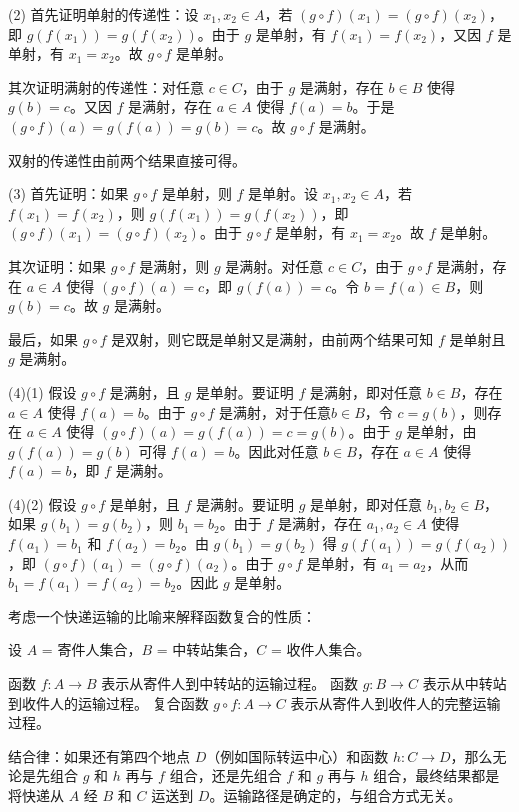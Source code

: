 (2) 首先证明单射的传递性：设 $x_1, x_2 \in A$，若 $(g \circ f)(x_1) = (g \circ f)(x_2)$，即 $g(f(x_1)) = g(f(x_2))$。由于 $g$ 是单射，有 $f(x_1) = f(x_2)$，又因 $f$ 是单射，有 $x_1 = x_2$。故 $g \circ f$ 是单射。

其次证明满射的传递性：对任意 $c \in C$，由于 $g$ 是满射，存在 $b \in B$ 使得 $g(b) = c$。又因 $f$ 是满射，存在 $a \in A$ 使得 $f(a) = b$。于是 $(g \circ f)(a) = g(f(a)) = g(b) = c$。故 $g \circ f$ 是满射。

双射的传递性由前两个结果直接可得。

(3) 首先证明：如果 $g \circ f$ 是单射，则 $f$ 是单射。设 $x_1, x_2 \in A$，若 $f(x_1) = f(x_2)$，则 $g(f(x_1)) = g(f(x_2))$，即 $(g \circ f)(x_1) = (g \circ f)(x_2)$。由于 $g \circ f$ 是单射，有 $x_1 = x_2$。故 $f$ 是单射。

其次证明：如果 $g \circ f$ 是满射，则 $g$ 是满射。对任意 $c \in C$，由于 $g \circ f$ 是满射，存在 $a \in A$ 使得 $(g \circ f)(a) = c$，即 $g(f(a)) = c$。令 $b = f(a) \in B$，则 $g(b) = c$。故 $g$ 是满射。

最后，如果 $g \circ f$ 是双射，则它既是单射又是满射，由前两个结果可知 $f$ 是单射且 $g$ 是满射。

(4)(1) 假设 $g \circ f$ 是满射，且 $g$ 是单射。要证明 $f$ 是满射，即对任意 $b \in B$，存在 $a \in A$ 使得 $f(a) = b$。由于 $g \circ f$ 是满射，对于任意$b \in B$，令 $c = g(b)$，则存在 $a \in A$ 使得 $(g \circ f)(a) =g(f(a))= c=g(b)$。由于 $g$ 是单射，由 $g(f(a)) = g(b)$ 可得 $f(a) = b$。因此对任意 $b \in B$，存在 $a \in A$ 使得 $f(a) = b$，即 $f$ 是满射。

(4)(2) 假设 $g \circ f$ 是单射，且 $f$ 是满射。要证明 $g$ 是单射，即对任意 $b_1, b_2 \in B$，如果 $g(b_1) = g(b_2)$，则 $b_1 = b_2$。由于 $f$ 是满射，存在 $a_1, a_2 \in A$ 使得 $f(a_1) = b_1$ 和 $f(a_2) = b_2$。由 $g(b_1) = g(b_2)$ 得 $g(f(a_1)) = g(f(a_2))$，即 $(g \circ f)(a_1) = (g \circ f)(a_2)$。由于 $g \circ f$ 是单射，有 $a_1 = a_2$，从而 $b_1 = f(a_1) = f(a_2) = b_2$。因此 $g$ 是单射。
\vspace{20pt}

考虑一个快递运输的比喻来解释函数复合的性质：

设 $A$ = 寄件人集合，$B$ = 中转站集合，$C$ = 收件人集合。

函数 $f: A \to B$ 表示从寄件人到中转站的运输过程。
函数 $g: B \to C$ 表示从中转站到收件人的运输过程。
复合函数 $g \circ f: A \to C$ 表示从寄件人到收件人的完整运输过程。

结合律：如果还有第四个地点 $D$（例如国际转运中心）和函数 $h: C \to D$，那么无论是先组合 $g$ 和 $h$ 再与 $f$ 组合，还是先组合 $f$ 和 $g$ 再与 $h$ 组合，最终结果都是将快递从 $A$ 经 $B$ 和 $C$ 运送到 $D$。运输路径是确定的，与组合方式无关。

